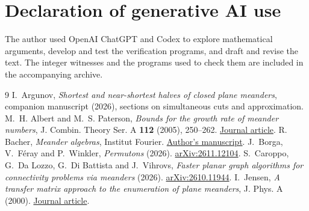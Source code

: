 \documentclass[11pt]{article}
\begin{document}
\section*{Declaration of generative AI use}
The author used OpenAI ChatGPT and Codex to explore mathematical arguments, develop and test the verification programs, and draft and revise the text. The integer witnesses and the programs used to check them are included in the accompanying archive.

\begin{thebibliography}{9}\small
{} I.~Argunov, \emph{Shortest and near-shortest halves of closed plane meanders}, companion manuscript (2026), sections on simultaneous cuts and approximation.
 M.~H. Albert and M.~S. Paterson, \emph{Bounds for the growth rate of meander numbers}, J. Combin. Theory Ser. A \textbf{112} (2005), 250--262.
\href{https://doi.org/10.1016/j.jcta.2005.02.006}{Journal article}.
 R. Bacher, \emph{Meander algebras}, Institut Fourier.
\href{https://www-fourier.univ-grenoble-alpes.fr/sites/default/files/ref_478.pdf}{Author's manuscript}.
 J.~Borga, V.~F\'eray and P.~Winkler, \emph{Permutons} (2026).
\href{https://arxiv.org/abs/2611.12104}{arXiv:2611.12104}.
 S.~Caroppo, G.~Da Lozzo, G.~Di Battista and J.~Vihrovs, \emph{Faster planar graph algorithms for connectivity problems via meanders} (2026).
\href{https://arxiv.org/abs/2610.11944}{arXiv:2610.11944}.
 I.~Jensen, \emph{A transfer matrix approach to the enumeration of plane meanders}, J. Phys. A (2000).
\href{https://doi.org/10.1088/0305-4470/33/34/301}{Journal article}.
\end{thebibliography}
\end{document}

